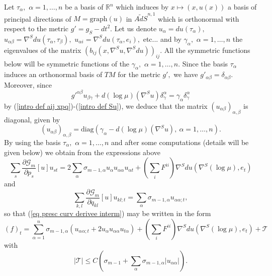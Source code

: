 \documentclass[10pt,reqno,oneside]{amsart}
\theoremstyle{definition}
\theoremstyle{remark}
\newcommand{\R}{\mathbb{R}}
\begin{document}
Let $\tau_{\alpha},$ $\alpha=1,\ldots,n$ be a basis of $\R^n$ which induces by $x\mapsto (x,u(x))$ a basis of principal directions of $M=\mbox{graph}(u)$ in $\widetilde{AdS}^{n,1}$ which is orthonormal with respect to the metric $g'=g_{S}-dt^2$. Let us denote $u_\alpha=du(\tau_\alpha),$ $u_{\alpha\beta}=\nabla^S d u(\tau_\alpha,\tau_\beta),$ $u_{\alpha i}=\nabla^S d u(\tau_\alpha,e_i),$ etc... and by $\gamma_{\alpha},$ $\alpha=1,\ldots, n$ the eigenvalues of the matrix $(b_{ij}(x,\nabla^Su,\nabla^Sdu))_{ij}$. All the symmetric functions below will be symmetric functions of the $\gamma_{\alpha},$ $\alpha=1,\ldots, n$. Since the basis $\tau_{\alpha}$ induces an orthonormal basis of $TM$ for the metric $g',$ we have $g'_{\alpha\beta}=\delta_{\alpha\beta}.$ Moreover, since 
$$g'^{\alpha\beta}u_{\beta\gamma}+d(\log\mu)(\nabla^S u)\delta_{\gamma}^\alpha=\gamma_{\alpha}\delta^{\alpha}_{\gamma}$$
by (\ref{intro def aij xpq})-(\ref{intro def Su}), we deduce that the matrix $(u_{\alpha\beta})_{\alpha,\beta}$ is diagonal, given by
\begin{equation}\label{uab diagonal}
(u_{\alpha\beta})_{\alpha,\beta}= \mbox{diag}\left(\gamma_{\alpha}-d(\log\mu)(\nabla^S u),\ \alpha=1,\ldots,n\right).
\end{equation}
By using the basis $\tau_{\alpha},$ $\alpha=1,\ldots,n$ and after some computations (details will be given below) we obtain from the expressions above 
\begin{equation}\label{partiel Gm ps interm}
\sum_s\frac{\partial\mathcal{G}_m}{\partial p_s}[u]u_{st}=2\sum_{\alpha}\sigma_{m-1,\alpha}u_\alpha u_{\alpha\alpha} u_{\alpha t}+(\sum_iF^{ii})\nabla^Sdu(\nabla^S(\log \mu),e_t)
\end{equation}
and
\begin{equation}
\sum_{k,l}\frac{\partial\mathcal{G}_m}{\partial q_{kl}}[u] u_{kl;t}=\sum_{\alpha}\sigma_{m-1,\alpha}u_{\alpha\alpha; t},
\end{equation}
so that (\ref{eq presc curv derivee interm}) may be written in the form
\begin{equation}\label{eq presc curv derivee C2b}
(f)_t=\sum_{\alpha=1}^n\sigma_{m-1,\alpha}(u_{\alpha\alpha;t}+2u_\alpha u_{\alpha\alpha}u_{t\alpha})+(\sum_i F^{ii})\nabla^S du(\nabla^S(\log\mu),e_t)+\mathcal{T}
\end{equation}
with 
\begin{equation}\label{formule T est C2b}
|\mathcal{T}|\leq C(\sigma_{m-1}+\sum_{\alpha}\sigma_{m-1,\alpha}|u_{\alpha\alpha}|).
\end{equation}
\end{document}
